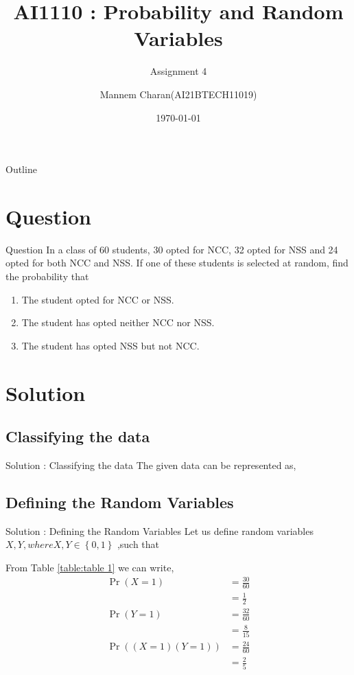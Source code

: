 \documentclass{beamer}
\title{AI1110 : Probability and Random Variables}
\subtitle{Assignment 4}
\author{Mannem Charan(AI21BTECH11019)}
\date{\today}
\providecommand{\pr}[1]{\ensuremath{\Pr\left(#1\right)}}
\providecommand{\brak}[1]{\ensuremath{\left(#1\right)}}
\providecommand{\cbrak}[1]{\ensuremath{\left\{#1\right\}}}
\begin{document}
\begin{frame}
    \titlepage 
\end{frame}


\begin{frame}{Outline}
    \tableofcontents
\end{frame}


\section{Question}
\begin{frame}{Question}
 In a class of 60 students, 30 opted for NCC, 32 opted for NSS and 24 opted for both NCC and NSS. If one of these students is selected at random, find the probability that
\begin{enumerate}[label = (\alph{enumi})]
    \item The student opted for NCC or NSS.
    \item The student has opted neither NCC nor NSS.
    \item The student has opted NSS but not NCC.
\end{enumerate}
\end{frame}


\section{Solution}
\subsection{Classifying the data}
\begin{frame}{Solution : Classifying the data}
     The given data can be represented as,
       \begin{table}[ht!]
        
        \caption{}
        \label{table:table 1}
       \end{table}
\end{frame}
\subsection{Defining the Random Variables}
\begin{frame}{ Solution : Defining the Random Variables}
  Let us define random variables $X,Y, where X,Y \in  \cbrak{0,1}$ ,such that
       \begin{table}[ht!]
        
        \caption{}
        \label{table:table 2}
       \end{table}
\end{frame}
   From Table \ref{table:table 1} we can write,
          \begin{align}
               \pr{X = 1} &= \frac{30}{60} \\
                          &=\frac{1}{2}\\
               \pr{Y = 1} &= \frac{32}{60} \\
                          &= \frac{8}{15}\label{eq:4}\\
               \pr{\brak{X = 1}\brak{Y=1}} &= \frac{24}{60}\\
                                           &= \frac{2}{5}\label{eq:6}
          \end{align}
\end{document}
